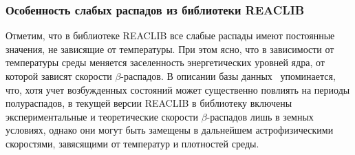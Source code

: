 \subsubsection{Особенность слабых распадов из библиотеки REACLIB}
  Отметим, что в библиотеке REACLIB все слабые распады имеют постоянные значения, не зависящие от температуры. При этом ясно, что в зависимости от температуры среды меняется заселенность энергетических уровней ядра, от которой зависят скорости $\beta$-распадов. В описании базы данных~\cite{reaclib2010} упоминается, что, хотя учет возбужденных состояний может существенно повлиять на периоды полураспадов, в текущей версии REACLIB в библиотеку включены экспериментальные и теоретические скорости $\beta$-распадов лишь в земных условиях, однако они могут быть замещены в дальнейшем астрофизическими скоростями, завясящими от температур и плотностей среды.
